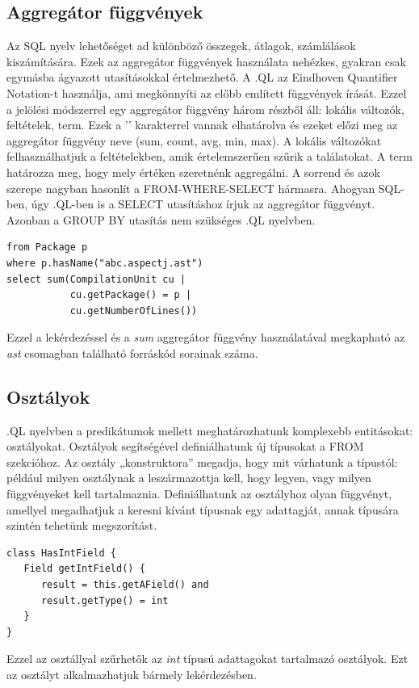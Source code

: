 \documentclass[a4paper,12pt]{report}
\begin{document}
\subsection{Aggregátor függvények}
Az SQL nyelv lehetőséget ad különböző összegek, átlagok, számlálások kiszámítására. Ezek az aggregátor függvények használata nehézkes, gyakran csak egymásba ágyazott utasításokkal értelmezhető. A .QL az Eindhoven Quantifier Notation-t \cite{eqn_1, eqn_2} használja, ami megkönnyíti az előbb említett függvények írását. Ezzel a jelölési módszerrel egy aggregátor függvény három részből áll: lokális változók, feltételek, term. Ezek a '\textbar' karakterrel vannak elhatárolva és ezeket előzi meg az aggregátor függvény neve (sum, count, avg, min, max). A lokális változókat felhasználhatjuk a feltételekben, amik értelemszerűen szűrik a találatokat. A term határozza meg, hogy mely értéken szeretnénk aggregálni. A sorrend és azok szerepe nagyban hasonlít a FROM-WHERE-SELECT hármasra. Ahogyan SQL-ben, úgy .QL-ben is a SELECT utasításhoz írjuk az aggregátor függvényt. Azonban a GROUP BY utasítás nem szükséges .QL nyelvben.
\begin{verbatim}
from Package p
where p.hasName("abc.aspectj.ast")
select sum(CompilationUnit cu |
           cu.getPackage() = p |
           cu.getNumberOfLines())
\end{verbatim}
Ezzel a lekérdezéssel és a \textit{sum} aggregátor függvény használatával megkapható az \textit{ast} csomagban található forráskód sorainak száma.
\subsection{Osztályok}
.QL nyelvben a predikátumok mellett meghatározhatunk komplexebb entitásokat: osztályokat. Osztályok segítségével definiálhatunk új típusokat a FROM szekcióhoz. Az osztály „konstruktora” megadja, hogy mit várhatunk a típustól: például milyen osztálynak a leszármazottja kell, hogy legyen, vagy milyen függvényeket kell tartalmaznia. Definiálhatunk az osztályhoz olyan függvényt, amellyel megadhatjuk a keresni kívánt típusnak egy adattagját, annak típusára szintén tehetünk megszorítást.
\begin{verbatim}
class HasIntField {
   Field getIntField() {
      result = this.getAField() and
      result.getType() = int
   }
}
\end{verbatim}
Ezzel az osztállyal szűrhetők az \textit{int} típusú adattagokat tartalmazó osztályok. Ezt az osztályt alkalmazhatjuk bármely lekérdezésben.
\end{document}

